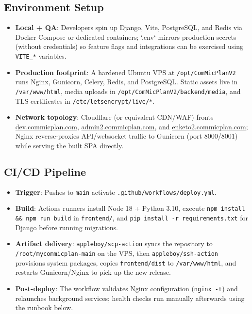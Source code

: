 \documentclass[11pt]{article}
\begin{document}
\subsection{Environment Setup}
\begin{itemize}[leftmargin=*]
  \item \textbf{Local + QA}: Developers spin up Django, Vite, PostgreSQL, and Redis via Docker Compose or dedicated containers; `.env` mirrors production secrets (without credentials) so feature flags and integrations can be exercised using \texttt{VITE\_*} variables.
  \item \textbf{Production footprint}: A hardened Ubuntu VPS at \texttt{/opt/ComMicPlanV2} runs Nginx, Gunicorn, Celery, Redis, and PostgreSQL. Static assets live in \texttt{/var/www/html}, media uploads in \texttt{/opt/ComMicPlanV2/backend/media}, and TLS certificates in \texttt{/etc/letsencrypt/live/*}.
  \item \textbf{Network topology}: Cloudflare (or equivalent CDN/WAF) fronts \href{https://dev.commicplan.com}{dev.commicplan.com}, \href{https://admin2.commicplan.com}{admin2.commicplan.com}, and \href{https://enketo2.commicplan.com}{enketo2.commicplan.com}; Nginx reverse-proxies API/websocket traffic to Gunicorn (port 8000/8001) while serving the built SPA directly.
\end{itemize}

\subsection{CI/CD Pipeline}
\begin{itemize}[leftmargin=*]
  \item \textbf{Trigger}: Pushes to \texttt{main} activate \texttt{.github/workflows/deploy.yml}.
  \item \textbf{Build}: Actions runners install Node 18 + Python 3.10, execute \texttt{npm install \&\& npm run build} in \texttt{frontend/}, and \texttt{pip install -r requirements.txt} for Django before running migrations.
  \item \textbf{Artifact delivery}: \texttt{appleboy/scp-action} syncs the repository to \texttt{/root/mycommicplan-main} on the VPS, then \texttt{appleboy/ssh-action} provisions system packages, copies \texttt{frontend/dist} to \texttt{/var/www/html}, and restarts Gunicorn/Nginx to pick up the new release.
  \item \textbf{Post-deploy}: The workflow validates Nginx configuration (\texttt{nginx -t}) and relaunches background services; health checks run manually afterwards using the runbook below.
\end{itemize}
\end{document}
